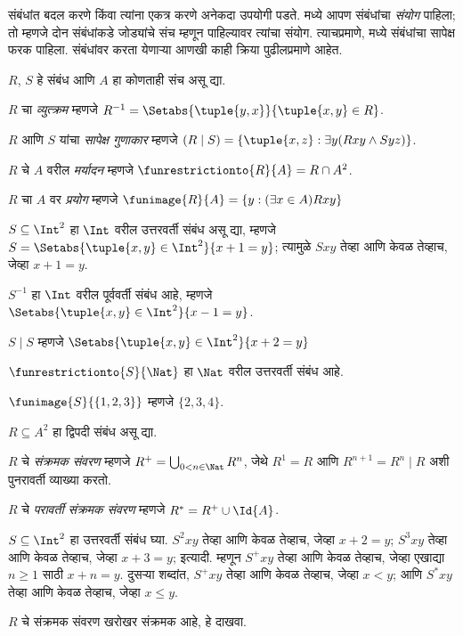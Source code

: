 \documentclass[../../../include/open-logic-section]{subfiles}
\begin{document}

संबंधांत बदल करणे किंवा त्यांना एकत्र करणे अनेकदा उपयोगी पडते.
 मध्ये आपण संबंधांचा
\emph{संयोग} पाहिला; तो म्हणजे दोन संबंधांकडे जोड्यांचे संच म्हणून
पाहिल्यावर त्यांचा संयोग. त्याचप्रमाणे,
 मध्ये संबंधांचा सापेक्ष फरक
पाहिला. संबंधांवर करता येणाऱ्या आणखी काही क्रिया पुढीलप्रमाणे आहेत.

\begin{defn}
$R$, $S$ हे संबंध आणि $A$ हा कोणताही संच असू द्या.

$R$ चा \emph{व्युत्क्रम} म्हणजे $R^{-1} = \Setabs{\tuple{y, x}}{\tuple{x,
    y} \in R}$.

$R$ आणि $S$ यांचा \emph{सापेक्ष गुणाकार} म्हणजे $(R \mid S) =
\{\tuple{x, z} : \exists y(Rxy \land Syz)\}$.

$R$ चे $A$ वरील \emph{मर्यादन} म्हणजे $\funrestrictionto{R}{A}= R
\cap A^2$.

$R$ चा $A$ वर \emph{प्रयोग} म्हणजे $\funimage{R}{A} = \{y :
(\exists x \in A)Rxy\}$
\end{defn}

\begin{ex}
$S \subseteq \Int^2$ हा $\Int$ वरील उत्तरवर्ती संबंध असू द्या, म्हणजे
$S = \Setabs{\tuple{x, y} \in \Int^2}{x + 1 = y}$; त्यामुळे $Sxy$
तेव्हा आणि केवळ तेव्हाच, जेव्हा $x + 1 = y$.

$S^{-1}$ हा $\Int$ वरील पूर्ववर्ती संबंध आहे, म्हणजे
$\Setabs{\tuple{x,y}\in\Int^2}{x -1 =y}$.

$S\mid S$ म्हणजे
$ \Setabs{\tuple{x,y}\in\Int^2}{x + 2 =y}$

$\funrestrictionto{S}{\Nat}$ हा $\Nat$ वरील उत्तरवर्ती संबंध आहे.

$\funimage{S}{\{1,2,3\}}$ म्हणजे $\{2, 3, 4\}$.
\end{ex}

\begin{defn} $R \subseteq A^2$ हा द्विपदी संबंध असू द्या.

$R$ चे \emph{संक्रमक संवरण} म्हणजे $R^+ = \bigcup_{0 < n \in
\Nat} R^n$, जेथे $R^1 = R$ आणि $R^{n+1} = R^n \mid R$ अशी पुनरावर्ती
व्याख्या करतो.

$R$ चे \emph{परावर्ती संक्रमक संवरण} म्हणजे $R^* = R^+ \cup \Id{A}$.
\end{defn}

\begin{ex}
$S \subseteq \Int^2$ हा उत्तरवर्ती संबंध घ्या. $S^2xy$ तेव्हा आणि केवळ
तेव्हाच, जेव्हा $x + 2 = y$; $S^3xy$ तेव्हा आणि केवळ तेव्हाच, जेव्हा
$x + 3 = y$; इत्यादी. म्हणून $S^+xy$ तेव्हा आणि केवळ तेव्हाच, जेव्हा
एखाद्या $n \geq 1$ साठी $x + n = y$. दुसऱ्या शब्दांत, $S^+xy$ तेव्हा
आणि केवळ तेव्हाच, जेव्हा $x < y$; आणि $S^*xy$ तेव्हा आणि केवळ तेव्हाच,
जेव्हा $x \le y$.
\end{ex}

\begin{prob}
$R$ चे संक्रमक संवरण खरोखर संक्रमक आहे, हे दाखवा.
\end{prob}
\end{document}
